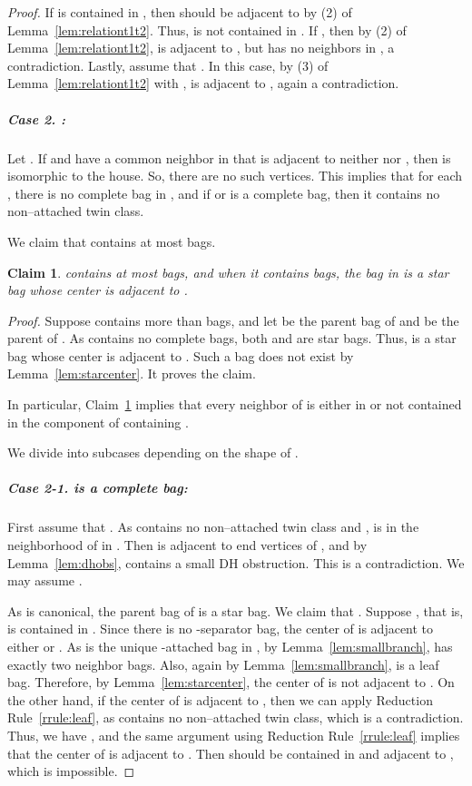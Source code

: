 \documentclass[11pt]{elsarticle}
\newtheorem{claim}{Claim}
\newenvironment{clproof}{\begin{list}{}{\setlength{\leftmargin}{5mm}} \item {\it Proof.} }{\hfill\end{list}\medskip}
\begin{document}
\begin{proof}
If  is contained in , then  should be adjacent to  by (2) of Lemma~\ref{lem:relationt1t2}.
Thus,   is not contained in .
If , then by (2) of Lemma~\ref{lem:relationt1t2},  is adjacent to , but  has no neighbors in , a contradiction. Lastly, assume that . In this case,  by (3) of Lemma~\ref{lem:relationt1t2} with , 
 is adjacent to , again a contradiction. 

\subparagraph{\textbf{Case 2.} :}  
Let .
If  and  have a common neighbor  in  that is adjacent to neither  nor , then
 is isomorphic to the house.
So, there are no such vertices. 
This implies that for each , there is no complete bag in ,
and if  or  is a complete bag, then it contains no non--attached twin class.

We claim that  contains at most  bags.

\begin{claim}\label{claim:restricted}
 contains at most  bags, and when it contains  bags, the bag in  is a star bag whose center is adjacent to .
\end{claim}
\begin{clproof}
Suppose  contains more than  bags, and let  be the parent bag of  and  be the parent of .
As   contains no complete bags,
both  and  are star bags. 
Thus,  is a star bag whose center is adjacent to .
Such a bag  does not exist by Lemma~\ref{lem:starcenter}. It proves the claim.
\end{clproof}

In particular, Claim~\ref{claim:restricted} implies that every neighbor of  is either in  or not contained in the component of  containing .






We divide into subcases depending on the shape of .

\subparagraph{\textbf{Case 2-1.}  is a complete bag:}

First assume that . As  contains no non--attached twin class and ,
 is in the neighborhood of  in . Then  is adjacent to end vertices of , and by Lemma~\ref{lem:dhobs}, 
 contains a small DH obstruction. This is a contradiction.
We may assume .

As  is canonical, 
the parent bag  of  is a star bag.
We claim that . Suppose , that is,  is contained in .
Since there is no -separator bag, the center of  is adjacent to either  or .
As  is the unique -attached bag in , 
by Lemma~\ref{lem:smallbranch},  has exactly two neighbor bags.
Also, again by Lemma~\ref{lem:smallbranch},  is a leaf bag.
Therefore, by Lemma~\ref{lem:starcenter}, the center of  is not adjacent to .
On the other hand, if the center of  is adjacent to , 
then we can apply Reduction Rule~\ref{rrule:leaf}, as  contains no non--attached twin class, which is a contradiction.
Thus, we have , and the same argument using Reduction Rule~\ref{rrule:leaf} implies that the center of  is adjacent to .
Then  should be contained in  and adjacent to , which is impossible.





\end{proof}
\end{document}
